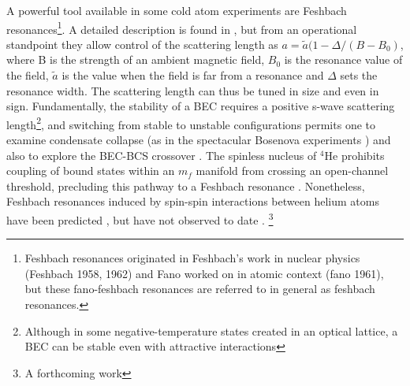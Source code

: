 	A powerful tool available in some cold atom experiments are Feshbach resonances\footnote{Feshbach resonances originated in Feshbach's work in nuclear physics (Feshbach 1958, 1962) and Fano worked on in atomic context (fano 1961), but these fano-feshbach resonances are referred to in general as feshbach resonances. }. A detailed description is found in \cite{Chin10}, but from an operational standpoint they allow control of the scattering length as $a = \tilde{a}(1-\Delta/(B-B_0)$, where B is the strength of an ambient magnetic field, $B_0$ is the resonance value of the field, $\tilde{a}$ is the value when the field is far from a resonance and $\Delta$ sets the resonance width. The scattering length can thus be tuned in size and even in sign. Fundamentally, the stability of a BEC requires a positive s-wave scattering length\footnote{Although in some negative-temperature states created in an optical lattice, a BEC can be stable even with attractive interactions }, and switching from stable to unstable configurations permits one to examine condensate collapse (as in the spectacular Bosenova experiments \cite{papers}) and also to explore the BEC-BCS crossover \cite{papers}. The spinless nucleus of $^4$He prohibits coupling of bound states within an $m_f$ manifold from crossing an open-channel threshold, precluding this pathway to a Feshbach resonance \cite{goosen10} . Nonetheless, Feshbach resonances induced by spin-spin interactions between helium atoms have been predicted \cite{venturi99, goosen10}, but have not observed to date \cite{borbely12}. \footnote{A forthcoming work }
	

